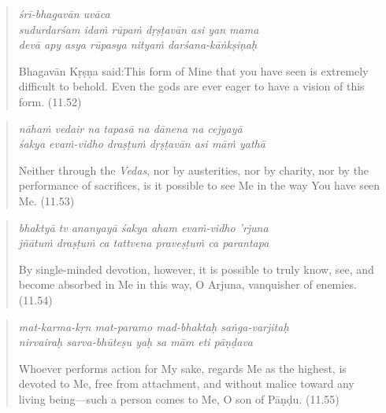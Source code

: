\documentclass[12pt, twoside, openright]{memoir}
\begin{document}
\par
\begin{verse}
\textit{śrī-bhagavān uvāca} \\
\textit{sudurdarśam idaṁ rūpaṁ dṛṣṭavān asi yan mama} \\
\textit{devā apy asya rūpasya nityaṁ darśana-kāṅkṣiṇaḥ}

\noindent \quad Bhagavān Kṛṣṇa said:\linebreak This form of Mine that you have seen is extremely difficult to behold. Even the gods are ever eager to have a vision of this form. (11.52)
\end{verse}
\par



\par
\begin{verse}
\textit{nāhaṁ vedair na tapasā na dānena na cejyayā} \\
\textit{śakya evaṁ-vidho draṣṭuṁ dṛṣṭavān asi māṁ yathā}

\noindent Neither through the \textit{Vedas}, nor by austerities, nor by charity, nor by the performance of sacrifices, is it possible to see Me in the way You have seen Me. (11.53)
\end{verse}
\par



\par
\begin{verse}
\textit{bhaktyā tv ananyayā śakya aham evaṁ-vidho ’rjuna} \\
\textit{jñātuṁ draṣṭuṁ ca tattvena praveṣṭuṁ ca parantapa}

\noindent By single-minded devotion, however, it is possible to truly know, see, and become absorbed in Me in this way, O Arjuna, vanquisher of enemies. (11.54)
\end{verse}
\par



\par
\begin{verse}
\textit{mat-karma-kṛn mat-paramo mad-bhaktaḥ saṅga-varjitaḥ} \\
\textit{nirvairaḥ sarva-bhūteṣu yaḥ sa mām eti pāṇḍava}

\noindent Whoever performs action for My sake, regards Me as the highest, is devoted to Me, free from attachment, and without malice toward any living being---such a person comes to Me, O son of Pāṇḍu. (11.55)
\end{verse}
\par
\end{document}
